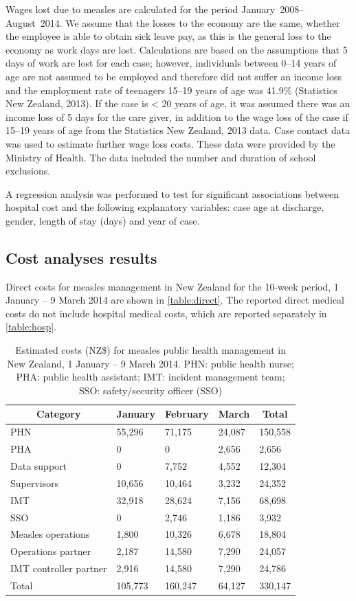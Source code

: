 \documentclass{article}
\begin{document}
Wages lost due to measles are calculated for the period January~2008--August~2014. We assume that the losses to the economy are the same, whether the employee is able to obtain sick leave pay, as this is the general loss to the economy as work days are lost. Calculations are based on the assumptions that 5 days of work are lost for each case; however, individuals between 0--14 years of age are not assumed to be employed and therefore did not suffer an income loss and the employment rate of teenagers 15--19 years of age was 41.9\%  (Statistics New Zealand, 2013). If the case is < 20 years of age, it was assumed there was an income loss of 5 days for the care giver, in addition to the wage loss of the case if 15--19 years of age from the Statistics New Zealand, 2013 data.  Case contact data was used to estimate further wage loss costs. These data were provided by the Ministry of Health. The data included the number and duration of school exclusions.

A regression analysis was performed to test for significant associations between hospital cost and the following explanatory variables: case age at discharge, gender, length of stay (days) and year of case.

\subsection{Cost analyses results}
\label{sub:cost_res}

Direct costs for measles management in New Zealand for the 10-week period, 1 January -- 9 March 2014 are shown in  \autoref{table:direct}. The reported direct medical costs do not include hospital medical costs, which are reported separately in \autoref{table:hosp}. 

\begin{table}
\begin{center}
\begin{tabular}{lllll}
\hline\hline
\multicolumn{1}{c}{Category}&\multicolumn{1}{c}{January}&\multicolumn{1}{c}{February}&\multicolumn{1}{c}{March}&\multicolumn{1}{c}{Total}\tabularnewline
\hline
PHN&55,296&71,175&24,087&150,558\tabularnewline
PHA&0&0&2,656&2,656\tabularnewline
Data support&0&7,752&4,552&12,304\tabularnewline
Supervisors&10,656&10,464&3,232&24,352\tabularnewline
IMT&32,918&28,624&7,156&68,698\tabularnewline
SSO&0&2,746&1,186&3,932\tabularnewline
Measles operations&1,800&10,326&6,678&18,804\tabularnewline
Operations partner&2,187&14,580&7,290&24,057\tabularnewline
IMT controller partner&2,916&14,580&7,290&24,786\tabularnewline
Total&105,773&160,247&64,127&330,147\tabularnewline
\hline
\end{tabular}\end{center}\caption{Estimated costs (NZ\$) for measles public health management in New Zealand, 1 January -- 9 March 2014. PHN: public health nurse; PHA: public health assistant; IMT: incident management team; SSO: safety/security officer (SSO)}
\label{table:direct}
\end{table}
\end{document}
